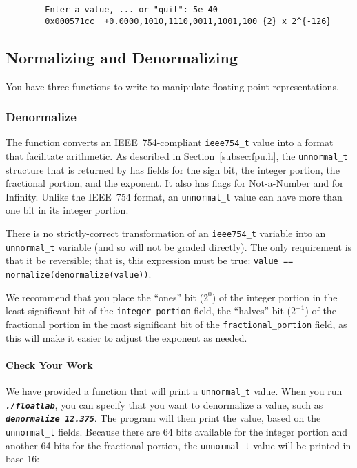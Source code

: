     \begin{verbatim}
        Enter a value, ... or "quit": 5e-40
        0x000571cc	+0.0000,1010,1110,0011,1001,100_{2} x 2^{-126}
    \end{verbatim}

    \subsection{Normalizing and Denormalizing}

    You have three functions to write to manipulate floating point representations.

    \subsubsection{Denormalize}

    The  function converts an IEEE~754-compliant \lstinline{ieee754_t} value into a format that facilitate arithmetic.
    As described in Section~\ref{subsec:fpu.h}, the \lstinline{unnormal_t} structure that is returned by  has fields for the sign bit, the integer portion, the fractional portion, and the exponent.
    It also has flags for Not-a-Number and for Infinity.
    Unlike the IEEE~754 format, an \lstinline{unnormal_t} value can have more than one bit in its integer portion.

    There is no strictly-correct transformation of an \lstinline{ieee754_t} variable into an \lstinline{unnormal_t} variable (and so  will not be graded directly).
    The only requirement is that it be reversible;
    that is, this expression must be true: \lstinline{value == normalize(denormalize(value))}.

    We recommend that you place the ``ones'' bit ($2^0$) of the integer portion in the least significant bit of the \lstinline{integer_portion} field, the ``halves'' bit ($2^{-1}$) of the fractional portion in the most significant bit of the \lstinline{fractional_portion} field, as this will make it easier to adjust the exponent as needed.

    \paragraph*{Check Your Work}

    We have provided a function that will print a \lstinline{unnormal_t} value.
    When you run \texttt{\textbf{\textit{./floatlab}}}, you can specify that you want to denormalize a value, such as \texttt{\textbf{\textit{denormalize 12.375}}}.
    The program will then print the value, based on the \lstinline{unnormal_t} fields.
    Because there are 64 bits available for the integer portion and another 64 bits for the fractional portion, the \lstinline{unnormal_t} value will be printed in base-16:

